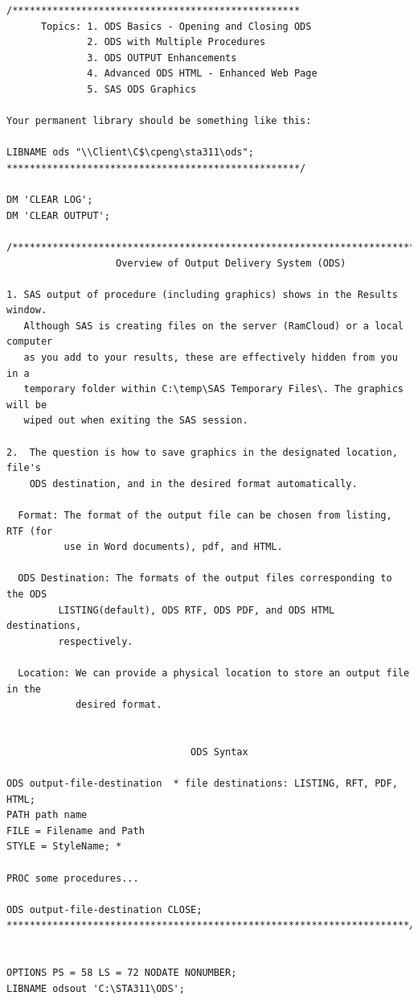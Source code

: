 \documentclass[
]{book}
\begin{document}
\begin{verbatim}
/**************************************************
      Topics: 1. ODS Basics - Opening and Closing ODS
              2. ODS with Multiple Procedures
              3. ODS OUTPUT Enhancements
              4. Advanced ODS HTML - Enhanced Web Page
              5. SAS ODS Graphics

Your permanent library should be something like this:

LIBNAME ods "\\Client\C$\cpeng\sta311\ods";
***************************************************/

DM 'CLEAR LOG';
DM 'CLEAR OUTPUT';

/****************************************************************************
                   Overview of Output Delivery System (ODS)

1. SAS output of procedure (including graphics) shows in the Results window.  
   Although SAS is creating files on the server (RamCloud) or a local computer 
   as you add to your results, these are effectively hidden from you in a 
   temporary folder within C:\temp\SAS Temporary Files\. The graphics will be 
   wiped out when exiting the SAS session.  

2.  The question is how to save graphics in the designated location, file's 
    ODS destination, and in the desired format automatically.

  Format: The format of the output file can be chosen from listing, RTF (for 
          use in Word documents), pdf, and HTML.

  ODS Destination: The formats of the output files corresponding to the ODS
         LISTING(default), ODS RTF, ODS PDF, and ODS HTML destinations, 
         respectively.

  Location: We can provide a physical location to store an output file in the
            desired format.


                                ODS Syntax

ODS output-file-destination  * file destinations: LISTING, RFT, PDF, HTML;
PATH path name
FILE = Filename and Path
STYLE = StyleName; *

PROC some procedures...

ODS output-file-destination CLOSE;
**********************************************************************/


OPTIONS PS = 58 LS = 72 NODATE NONUMBER;
LIBNAME odsout 'C:\STA311\ODS';


\end{verbatim}
\end{document}
